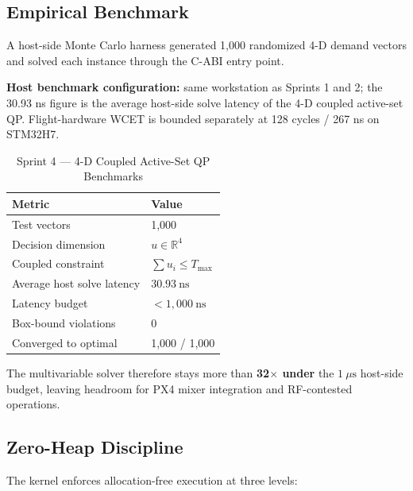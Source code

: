 \documentclass[11pt]{article}
\begin{document}
\subsection{Empirical Benchmark}

A host-side Monte Carlo harness generated 1,000 randomized 4-D demand vectors and solved each instance through the C-ABI entry point.

\textbf{Host benchmark configuration:} same workstation as Sprints 1 and 2; the 30.93 ns figure is the average host-side solve latency of the 4-D coupled active-set QP. Flight-hardware WCET is bounded separately at 128 cycles / 267 ns on STM32H7.

\begin{table}[htbp]
\centering
\caption{Sprint 4 --- 4-D Coupled Active-Set QP Benchmarks}
\label{tab:sprint4}
\begin{tabularx}{\textwidth}{@{}lX@{}}
\toprule
\textbf{Metric} & \textbf{Value} \\
\midrule
Test vectors & 1,000 \\
Decision dimension & $u \in \mathbb{R}^4$ \\
Coupled constraint & $\sum u_i \le T_{\max}$ \\
Average host solve latency & $30.93\ \text{ns}$ \\
Latency budget & $< 1{,}000\ \text{ns}$ \\
Box-bound violations & 0 \\
Converged to optimal & 1,000 / 1,000 \\
\bottomrule
\end{tabularx}
\end{table}

The multivariable solver therefore stays more than \textbf{32$\times$ under} the $1\ \mu\text{s}$ host-side budget, leaving headroom for PX4 mixer integration and RF-contested operations.

\subsection{Zero-Heap Discipline}

The kernel enforces allocation-free execution at three levels:
\end{document}
